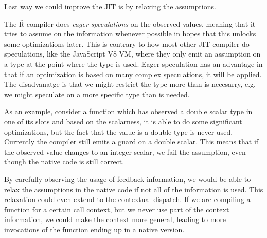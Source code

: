 Last way we could improve the JIT is by relaxing the assumptions.

The Ř compiler does \textit{eager speculations} on the observed values, meaning that it tries to assume on the information whenever possible in hopes that this unlocks some optimizations later. This is contrary to how most other JIT compiler do speculations, like the JavaScript V8 VM\todocite, where they only emit an assumption on a type at the point where the type is used. Eager speculation has an advantage in that if an optimization is based on many complex speculations, it will be applied. The disadvanatge is that we might restrict the type more than is necesarry, e.g. we might speculate on a more specific type than is needed.

As an example, consider a function which has observed a double scalar type in one of its slots and based on the scalarness, it is able to do some significant optimizations, but the fact that the value is a double type is never used. Currently the compiler still emits a guard on a double scalar. This means that if the observed value changes to an integer scalar, we fail the assumption, even though the native code is still correct.

By carefully observing the usage of feedback information, we would be able to relax the assumptions in the native code if not all of the information is used. This relaxation could even extend to the contextual dispatch. If we are compiling a function for a certain call context, but we never use part of the context information, we could make the context more general, leading to more invocations of the function ending up in a native version.


